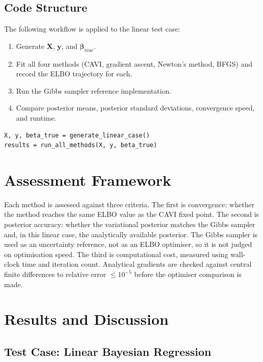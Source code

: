 \documentclass[11pt,a4paper]{article}
\begin{document}
\subsection{Code Structure}

The following workflow is applied to the linear test case:
\begin{enumerate}
\item Generate $\bm{X}$, $\bm{y}$, and $\bm{\beta}_{\mathrm{true}}$.
\item Fit all four methods (CAVI, gradient ascent, Newton's method, BFGS) and record the ELBO trajectory for each.
\item Run the Gibbs sampler reference implementation.
\item Compare posterior means, posterior standard deviations, convergence speed, and runtime.
\end{enumerate}

\begin{verbatim}
X, y, beta_true = generate_linear_case()
results = run_all_methods(X, y, beta_true)
\end{verbatim}

\section{Assessment Framework}

Each method is assessed against three criteria. The first is convergence: whether the method reaches the same ELBO value as the CAVI fixed point. The second is posterior accuracy: whether the variational posterior matches the Gibbs sampler and, in this linear case, the analytically available posterior. The Gibbs sampler is used as an uncertainty reference, not as an ELBO optimiser, so it is not judged on optimisation speed. The third is computational cost, measured using wall-clock time and iteration count. Analytical gradients are checked against central finite differences to relative error $\leq 10^{-5}$ before the optimiser comparison is made.

\section{Results and Discussion}
\label{sec:results}

\subsection{Test Case: Linear Bayesian Regression}
\end{document}
